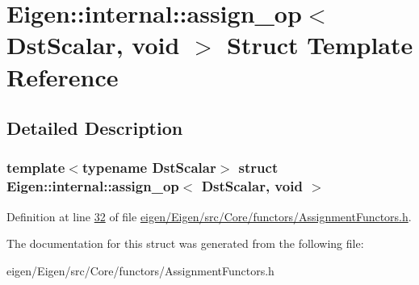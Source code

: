 \hypertarget{struct_eigen_1_1internal_1_1assign__op_3_01_dst_scalar_00_01void_01_4}{}\section{Eigen\+:\+:internal\+:\+:assign\+\_\+op$<$ Dst\+Scalar, void $>$ Struct Template Reference}
\label{struct_eigen_1_1internal_1_1assign__op_3_01_dst_scalar_00_01void_01_4}


\subsection{Detailed Description}
\subsubsection*{template$<$typename Dst\+Scalar$>$\newline
struct Eigen\+::internal\+::assign\+\_\+op$<$ Dst\+Scalar, void $>$}



Definition at line \hyperlink{eigen_2_eigen_2src_2_core_2functors_2_assignment_functors_8h_source_l00032}{32} of file \hyperlink{eigen_2_eigen_2src_2_core_2functors_2_assignment_functors_8h_source}{eigen/\+Eigen/src/\+Core/functors/\+Assignment\+Functors.\+h}.



The documentation for this struct was generated from the following file\+:\begin{DoxyCompactItemize}
\item 
eigen/\+Eigen/src/\+Core/functors/\+Assignment\+Functors.\+h\end{DoxyCompactItemize}

